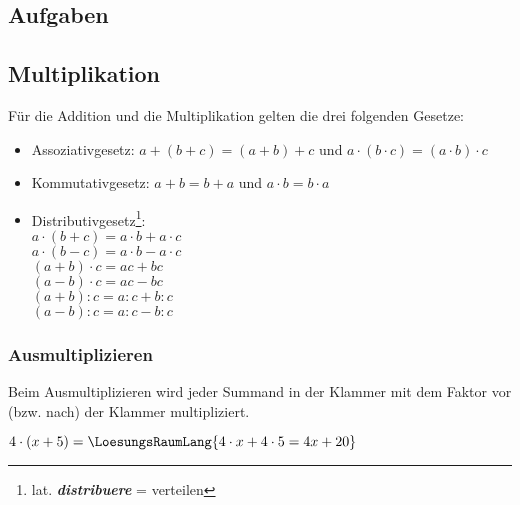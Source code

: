 \subsection*{Aufgaben}

\newpage
\subsection{Multiplikation}

Für die Addition und die Multiplikation gelten die drei folgenden
Gesetze:



\begin{gesetz}{}{}
\begin{itemize}
\item  Assoziativgesetz:
  $a+(b+c) = (a+b) +c$ und $a\cdot(b\cdot{}c) = (a\cdot b)\cdot c$
\item Kommutativgesetz:
  $a+b = b+a$ und $a\cdot b = b \cdot a$
\item Distributivgesetz\footnote{lat. \textit{\textbf{distribuere}} = verteilen}:\\
  $a\cdot (b+c) = a\cdot b + a\cdot c$\\
  $a\cdot (b-c) = a\cdot b - a\cdot c$\\
  $(a+b)\cdot c = ac + bc$\\
  $(a-b)\cdot c = ac - bc$\\
  $(a+b):c = a:c + b:c$\\
  $(a-b):c = a:c - b:c$\\
  
  \end{itemize}
\end{gesetz}

\newpage

\subsubsection{Ausmultiplizieren}
Beim Ausmultiplizieren wird jeder Summand in der Klammer mit dem
Faktor vor (bzw. nach) der Klammer multipliziert.
\begin{beispiel}{}{}
  $4\cdot (x + 5) =\LoesungsRaumLang{4\cdot x + 4\cdot 5 = 4x + 20}$
\end{beispiel}

